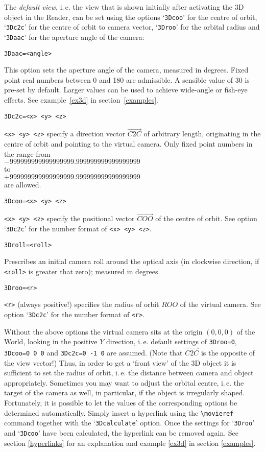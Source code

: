 \documentclass[a4paper]{article}
\begin{document}
The \emph{default view}, i.\,e. the view that is shown initially after activating the 3D object in the Reader, can be set using the options `\verb+3Dcoo+' for the centre of orbit, `\verb+3Dc2c+' for the centre of orbit to camera vector, `\verb+3Droo+' for the orbital radius and `\verb+3Daac+' for the aperture angle of the camera:
\begin{verbatim}
3Daac=<angle>
\end{verbatim}
This option sets the aperture angle of the camera, measured in degrees. Fixed point real numbers between 0 and 180 are admissible. A sensible value of 30 is pre-set by default. Larger values can be used to achieve wide-angle or fish-eye effects. See example~\ref{ex3d} in section~\ref{examples}.
\begin{verbatim}
3Dc2c=<x> <y> <z>
\end{verbatim}
\verb+<x> <y> <z>+ specify a direction vector $\overrightarrow{C2C}$ of arbitrary length, originating in the centre of orbit and pointing to the virtual camera. Only fixed point numbers in the range from\\[1ex]
\phantom{xxxx}$-999999999999999999.999999999999999999$\\
to\\
\phantom{xxxx}$+999999999999999999.999999999999999999$\\[1ex]
are allowed.
\begin{verbatim}
3Dcoo=<x> <y> <z>
\end{verbatim}
\verb+<x> <y> <z>+ specify the positional vector $\overrightarrow{COO}$ of the centre of orbit. See option `\verb+3Dc2c+' for the number format of \verb+<x> <y> <z>+.
\begin{verbatim}
3Droll=<roll>
\end{verbatim}
Prescribes an initial camera roll around the optical axis (in clockwise direction, if \verb+<roll>+ is greater that zero); measured in degrees.
\begin{verbatim}
3Droo=<r>
\end{verbatim}
\verb+<r>+ (always positive!) specifies the radius of orbit $ROO$ of the virtual camera. See option `\verb+3Dc2c+' for the number format of \verb+<r>+.

Without the above options the virtual camera sits at the origin $(0,0,0)$ of the World, looking in the positive $Y$ direction, i.\,e. default settings of \verb+3Droo=0+, \verb+3Dcoo=0 0 0+ and  \verb+3Dc2c=0 -1 0+ are assumed. (Note that $\overrightarrow{C2C}$ is the opposite of the view vector!) Thus, in order to get a `front view' of the 3D object it is sufficient to set the radius of orbit, i.\,e. the distance between camera and object appropriately. Sometimes you may want to adjust the orbital centre, i.\,e. the target of the camera as well, in particular, if the object is irregularly shaped. Fortunately, it is possible to let the values of the corresponding options be determined automatically. Simply insert a hyperlink using the \verb+\movieref+ command together with the `\verb+3Dcalculate+' option. Once the settings for `\verb+3Droo+' and `\verb+3Dcoo+' have been calculated, the hyperlink can be removed again. See section \ref{hyperlinks} for an explanation and example \ref{ex3d} in section \ref{examples}.
\end{document}
